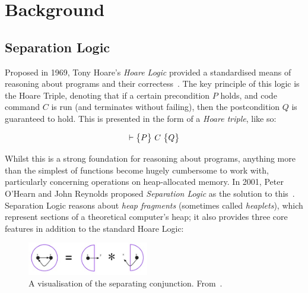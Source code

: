 \chapter{Background}
\label{sec:background}

\section{Separation Logic}

Proposed in 1969, Tony Hoare's \textit{Hoare Logic} provided a standardised
means of reasoning about programs and their correctess~\cite{hoare}. The key
principle of this logic is the Hoare Triple, denoting that if a certain
precondition $P$ holds, and code command $C$ is run (and terminates without
failing), then the postcondition $Q$ is guaranteed to hold. This is presented
in the form of a \textit{Hoare triple}, like so:

$$
  \triple{P}{C}{Q}
$$

Whilst this is a strong foundation for reasoning about programs, anything more
than the simplest of functions become hugely cumbersome to work with,
particularly concerning operations on heap-allocated memory. In 2001, Peter
O'Hearn and John Reynolds proposed \textit{Separation Logic} as the solution to
this~\cite{separation-logic}. Separation Logic reasons about
\textit{heap fragments} (sometimes called \textit{heaplets}), which represent
sections of a theoretical computer's heap; it also provides three core features
in addition to the standard Hoare Logic:

\begin{figure}
  \centering
  \includegraphics[width=200px]{img/separating-conjunction.jpg}
  \caption{
    A visualisation of the separating conjunction.
    From~\cite{infer-sl}.
  }
  \label{fig:separating-conjunction}
\end{figure}

